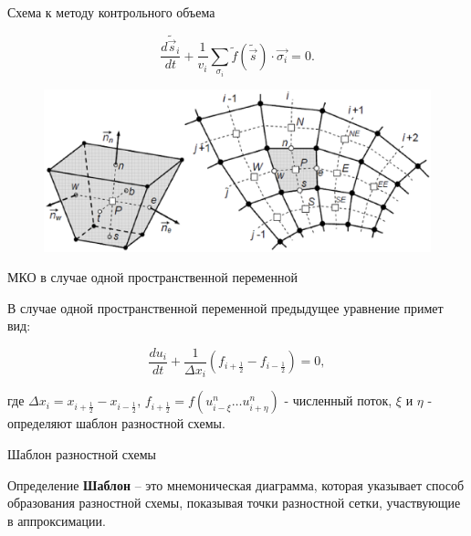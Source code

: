\documentclass[10pt,xcolor=pst,aspectratio=169]{beamer}
\begin{document}
\begin{frame}{Схема к методу контрольного объема}

	\transdissolve[duration=0.1]
	\justifying
	\large

	\[
		\frac{d \tilde{\vec{s}}_{i}}{d t} + \frac{1}{v_{i}} \sum_{\sigma_{i}} \tilde{f} (\tilde{\vec{s}}) \cdot \vec{\sigma_{i}} = 0.
	\]

	\begin{figure}
		\includegraphics[width=0.8\linewidth]{FVM_scheme.eps}
	\end{figure}

\end{frame}

\begin{frame}{МКО в случае одной пространственной переменной}

	\transdissolve[duration=0.1]
	\justifying
	\large

	В случае одной пространственной переменной предыдущее уравнение примет вид:

	\[
		\frac{d u_{i}}{d t} + \frac{1}{\Delta x_{i}} \left( f_{i + \frac{1}{2}} - f_{i - \frac{1}{2}} \right) = 0,
	\]

	где $\Delta x_{i} = x_{i + \frac{1}{2}} - x_{i - \frac{1}{2}}$, $f_{i + \frac{1}{2}} = f \left( u^{n}_{i - \xi} \ldots u^{n}_{i + \eta} \right)$ - численный поток, $\xi$ и $\eta$ - определяют шаблон разностной схемы.

\end{frame}

\begin{frame}{Шаблон разностной схемы}

	\transdissolve[duration=0.1]
	\justifying
	\large

	\begin{block}{Определение}
		\justifying
		\textbf{Шаблон} -- это мнемоническая диаграмма, которая указывает способ образования разностной схемы, показывая точки разностной сетки, участвующие в аппроксимации.
	\end{block}
 
\end{frame}
\end{document}
